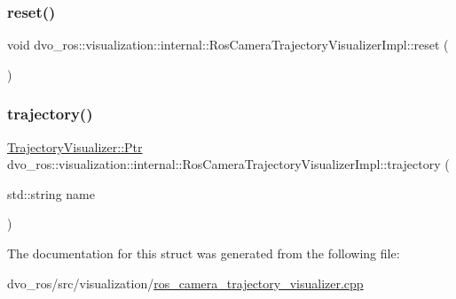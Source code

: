\subsubsection{\texorpdfstring{reset()}{reset()}}
{\footnotesize\ttfamily void dvo\+\_\+ros\+::visualization\+::internal\+::\+Ros\+Camera\+Trajectory\+Visualizer\+Impl\+::reset (\begin{DoxyParamCaption}{ }\end{DoxyParamCaption})\hspace{0.3cm}{\ttfamily [inline]}}

\mbox{\label{structdvo__ros_1_1visualization_1_1internal_1_1_ros_camera_trajectory_visualizer_impl_a1228b6fa3e346cc73f40e3231b8570ef}} 
\subsubsection{\texorpdfstring{trajectory()}{trajectory()}}
{\footnotesize\ttfamily \mbox{\hyperlink{classdvo_1_1visualization_1_1_trajectory_visualizer_aac33ef5979fe64ee33409f1afa977fd3}{Trajectory\+Visualizer\+::\+Ptr}} dvo\+\_\+ros\+::visualization\+::internal\+::\+Ros\+Camera\+Trajectory\+Visualizer\+Impl\+::trajectory (\begin{DoxyParamCaption}\item[{std\+::string}]{name }\end{DoxyParamCaption})\hspace{0.3cm}{\ttfamily [inline]}}



The documentation for this struct was generated from the following file\+:\begin{DoxyCompactItemize}
\item 
dvo\+\_\+ros/src/visualization/\mbox{\hyperlink{ros__camera__trajectory__visualizer_8cpp}{ros\+\_\+camera\+\_\+trajectory\+\_\+visualizer.\+cpp}}\end{DoxyCompactItemize}
